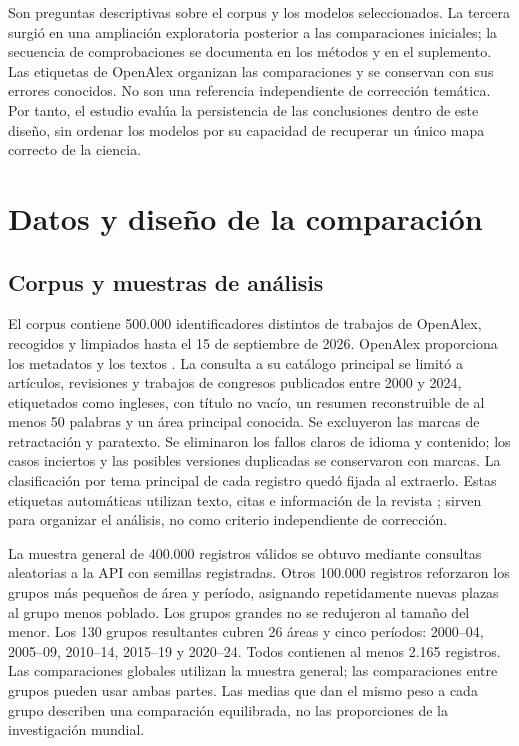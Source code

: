 \documentclass[12pt]{article}
\begin{document}
Son preguntas descriptivas sobre el corpus y los modelos seleccionados. La tercera surgió en una ampliación exploratoria posterior a las comparaciones iniciales; la secuencia de comprobaciones se documenta en los métodos y en el suplemento. Las etiquetas de OpenAlex organizan las comparaciones y se conservan con sus errores conocidos. No son una referencia independiente de corrección temática. Por tanto, el estudio evalúa la persistencia de las conclusiones dentro de este diseño, sin ordenar los modelos por su capacidad de recuperar un único mapa correcto de la ciencia.

\section{Datos y diseño de la comparación}
\subsection{Corpus y muestras de análisis}
El corpus contiene 500.000 identificadores distintos de trabajos de OpenAlex, recogidos y limpiados hasta el 15 de septiembre de 2026. OpenAlex proporciona los metadatos y los textos \citep{priem2022openalex}. La consulta a su catálogo principal se limitó a artículos, revisiones y trabajos de congresos publicados entre 2000 y 2024, etiquetados como ingleses, con título no vacío, un resumen reconstruible de al menos 50 palabras y un área principal conocida. Se excluyeron las marcas de retractación y paratexto. Se eliminaron los fallos claros de idioma y contenido; los casos inciertos y las posibles versiones duplicadas se conservaron con marcas. La clasificación por tema principal de cada registro quedó fijada al extraerlo. Estas etiquetas automáticas utilizan texto, citas e información de la revista \citep{openalex2026topics}; sirven para organizar el análisis, no como criterio independiente de corrección.

La muestra general de 400.000 registros válidos se obtuvo mediante consultas aleatorias a la API con semillas registradas. Otros 100.000 registros reforzaron los grupos más pequeños de área y período, asignando repetidamente nuevas plazas al grupo menos poblado. Los grupos grandes no se redujeron al tamaño del menor. Los 130 grupos resultantes cubren 26 áreas y cinco períodos: 2000--04, 2005--09, 2010--14, 2015--19 y 2020--24. Todos contienen al menos 2.165 registros. Las comparaciones globales utilizan la muestra general; las comparaciones entre grupos pueden usar ambas partes. Las medias que dan el mismo peso a cada grupo describen una comparación equilibrada, no las proporciones de la investigación mundial.
\end{document}
